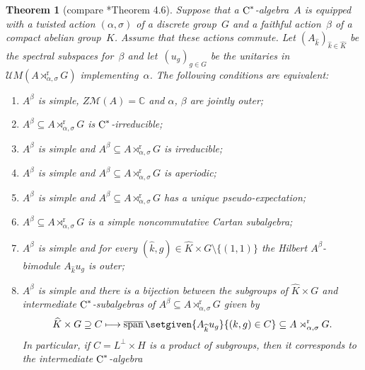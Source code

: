 \documentclass[a4paper]{amsart}
\theoremstyle{plain}
\newtheorem{theorem}{Theorem}
\theoremstyle{definition}
\theoremstyle{remark}
\numberwithin{theorem}{section}
\numberwithin{equation}{section}
\DeclareMathOperator*{\clsp}{\overline{span}} %
\newcommand*{\nb}{\nobreakdash}
\newcommand*{\C}{\mathbb C}
\newcommand*{\red}{\mathrm{r}}%
\newcommand*{\Cst}{\textup C^*}%
\newcommand*{\Mult}{\mathcal M}%
\newcommand*{\UMult}{\mathcal UM}%
\begin{document}
\begin{theorem}[compare \cite{Echterhoff-Rordam:Inclusions}*{Theorem
    4.6}]
  \label{thm:Echterhoff-Rordam}
  Suppose that a \(\Cst\)\nb-algebra~\(A\) is equipped with a twisted
  action \((\alpha,\sigma)\) of a discrete group~\(G\) and a faithful
  action~\(\beta\) of a compact abelian group~\(K\).
  Assume that these actions commute.
  Let \((A_{\widehat{k}})_{\widehat{k}\in \widehat{K}}\) be the
  spectral subspaces for~\(\beta\) and let~\((u_g)_{g\in G}\) be the
  unitaries in \(\UMult(A\rtimes_{\alpha,\sigma}^\red G)\)
  implementing~\(\alpha\).
  The following conditions are equivalent:
  \begin{enumerate}
  \item \label{enu:Echterhoff-Rordam0}%
    \(A^\beta\) is simple, \(Z\Mult(A)=\C\) and  \(\alpha\), \(\beta\)
    are jointly outer;
  \item \label{enu:Echterhoff-Rordam1}%
    \(A^\beta\subseteq A\rtimes_{\alpha,\sigma}^\red G\) is
    \(\Cst\)\nb-irreducible;
  \item \label{enu:Echterhoff-Rordam2}%
    \(A^\beta\) is simple and \(A^\beta\subseteq
    A\rtimes_{\alpha,\sigma}^\red G\) is irreducible;
  \item \label{enu:Echterhoff-Rordam3}%
    \(A^\beta\) is simple and \(A^\beta\subseteq
    A\rtimes^\red_{\alpha,\sigma} G\) is aperiodic;
  \item \label{enu:Echterhoff-Rordam31}%
    \(A^\beta\) is simple and \(A^\beta\subseteq
    A\rtimes^\red_{\alpha,\sigma} G\) has a unique pseudo-expectation;
  \item \label{enu:Echterhoff-Rordam32}%
    \(A^\beta\subseteq A\rtimes^\red_{\alpha,\sigma} G\) is a simple
    noncommutative Cartan subalgebra;
  \item \label{enu:Echterhoff-Rordam4}%
    \(A^\beta\) is simple and for every \((\widehat{k},g)\in
    \widehat{K}\times G\setminus \{(1,1)\}\) the Hilbert
    \(A^\beta\)-bimodule \(A_{\widehat{k}}u_g\) is  outer;
  \item \label{enu:Echterhoff-Rordam45}%
    \(A^\beta\) is simple and there is a bijection between the
    subgroups of \(\widehat{K}\times G\) and intermediate
    \(\Cst\)\nb-subalgebras of \(A^\beta\subseteq
    A\rtimes_{\alpha,\sigma}^\red G\) given by
    \[
      \widehat{K}\times G\supseteq C \longmapsto \clsp\setgiven{A_{\widehat{k}}u_g}{(k,g)\in C} \subseteq A\rtimes^\red_{\alpha,\sigma} G.
    \]
    In particular, if \(C=L^\bot\times H\) is a product of subgroups,
    then it corresponds to the intermediate \(\Cst\)\nb-algebra

\end{enumerate}
\end{theorem}
\end{document}

